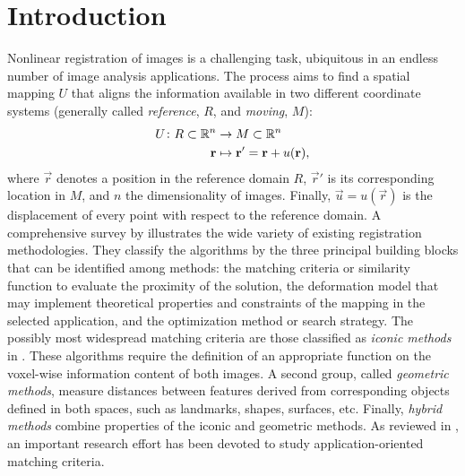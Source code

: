 \section{Introduction}
\label{sec:introduction}

Nonlinear registration of images is a challenging task, ubiquitous
  in an endless number of image analysis applications.
The process aims to find a spatial mapping $U$ that aligns the information available
  in two different coordinate systems (generally called
  \emph{reference}, $R$, and \emph{moving}, $M$):
  \begin{align}
  U\colon R \subset \mathbb{R}^n &\to M \subset \mathbb{R}^n \notag\\
  \vec{r} &\mapsto \vec{r}' =\vec{r}+u(\vec{r}),
  \label{eq:transform}
  \end{align}
  where $\vec{r}$ denotes a position in the reference domain $R$, $\vec{r}'$ is
  its corresponding location in $M$, and $n$ the dimensionality of images.
Finally, $\vec{u} = u(\vec{r})$ is the displacement of every point with respect
  to the reference domain.
A comprehensive survey by \citeauthor{sotiras_deformable_2013} \citep{sotiras_deformable_2013}
  illustrates the wide variety of existing registration methodologies.
They classify the algorithms by the three principal building blocks that can be identified
  among methods: the matching criteria or similarity function to evaluate the proximity of
  the solution, the deformation model that may implement theoretical properties and constraints
  of the mapping in the selected application, and the optimization method or search strategy.
The possibly most widespread matching criteria are those classified as \emph{iconic
  methods} in \citep{sotiras_deformable_2013}.
These algorithms require the definition of an appropriate function on the voxel-wise information
  content of both images.
A second group, called \emph{geometric methods}, measure distances between features derived from
  corresponding objects defined in both spaces, such as landmarks, shapes, surfaces, etc.
Finally, \emph{hybrid methods} combine properties of the iconic and geometric methods.
As reviewed in \citep{sotiras_deformable_2013}, an important research effort has been devoted to
  study application-oriented matching criteria.

